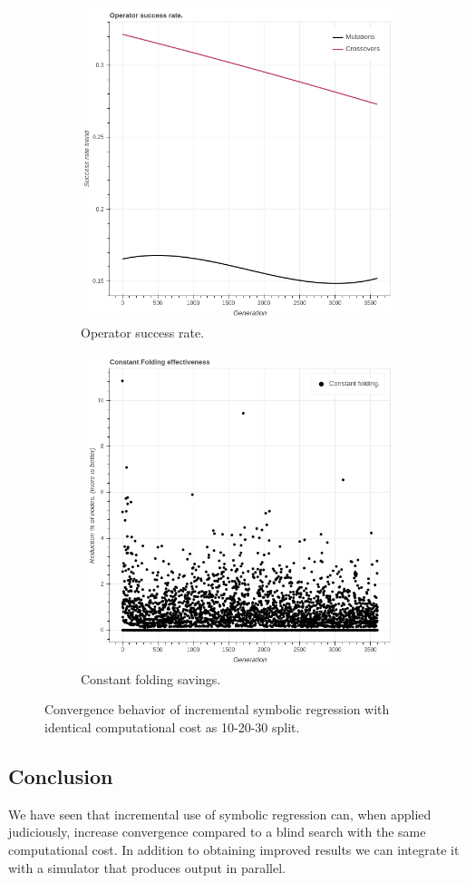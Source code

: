 \begin{figure}
\begin{subfigure}{0.5\textwidth}
        \includegraphics[width=0.8\linewidth]{figures/incrementaloperatorsuccessrate30d.png}
        \caption{Operator success rate.}
    \end{subfigure}
    \begin{subfigure}{0.5\textwidth}
        \includegraphics[width=0.8\linewidth]{figures/incrementalconstfolding30d.png}
        \caption{Constant folding savings.}
    \end{subfigure}
    \caption{Convergence behavior of incremental symbolic regression with identical computational cost as 10-20-30 split.}
    \label{fig:incrementaldoubleconvergence}
\end{figure}
\subsection{Conclusion}
We have seen that incremental use of symbolic regression can, when applied judiciously, increase convergence compared to a blind search with the same computational cost. In addition to obtaining improved results we can integrate it with a simulator that produces output in parallel.
